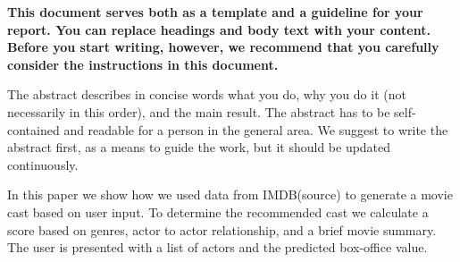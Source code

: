 \textbf{This document serves both as a template and a guideline for your report. You can replace headings and body text with your content. Before you start writing, however, we recommend that you carefully consider the instructions in this document.
}

The abstract describes in concise words what you do, why you do it (not
necessarily in this order), and the main result. The abstract
has to be self-contained and readable for a person in the
general area. We suggest to write the abstract first,
as a means to guide the work, but it should be updated continuously.

In this paper we show how we used data from IMDB(source) to generate a movie cast based on user input. To determine the 
recommended cast we calculate a score based on genres, actor to actor relationship, and a brief movie summary. The user
is presented with a list of actors and the predicted box-office value.